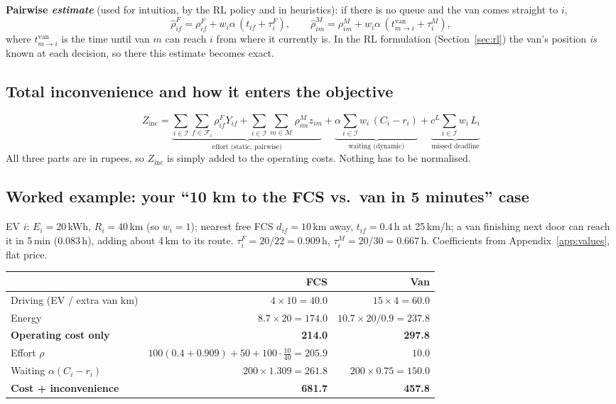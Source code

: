 \documentclass[11pt,a4paper]{article}
\newcommand{\I}{\mathcal{I}}
\newcommand{\F}{\mathcal{F}}
\newcommand{\M}{\mathcal{M}}
\begin{document}
\textbf{Pairwise \emph{estimate}} (used for intuition, by the RL policy and in heuristics): if there is no queue and the van comes straight to $i$,
\[
\hat\rho^{F}_{if}=\rho^F_{if}+w_i\alpha\,(t_{if}+\tau^F_i),\qquad
\hat\rho^{M}_{im}=\rho^M_{im}+w_i\alpha\,(t^{\text{van}}_{m\to i}+\tau^M_i),
\]
where $t^{\text{van}}_{m\to i}$ is the time until van $m$ can reach $i$ from where it currently is. In the RL formulation (Section~\ref{sec:rl}) the van's position \emph{is} known at each decision, so there this estimate becomes exact.

\subsection{Total inconvenience and how it enters the objective}

\begin{equation}
\boxed{\;
Z_{\text{inc}}=\underbrace{\sum_{i\in\I}\sum_{f\in\F_i}\rho^F_{if}Y_{if}+\sum_{i\in\I}\sum_{m\in\M}\rho^M_{im}z_{im}}_{\text{effort (static, pairwise)}}
+\underbrace{\alpha\sum_{i\in\I}w_i\,(C_i-r_i)}_{\text{waiting (dynamic)}}
+\underbrace{c^L\sum_{i\in\I}w_i\,L_i}_{\text{missed deadline}}
\;}\label{eq:inc}
\end{equation}
All three parts are in rupees, so $Z_{\text{inc}}$ is simply added to the operating costs. Nothing has to be normalised.

\subsection{Worked example: your ``10 km to the FCS vs.\ van in 5 minutes'' case}

EV $i$: $E_i=20$\,kWh, $R_i=40$\,km (so $w_i=1$); nearest free FCS $d_{if}=10$\,km away, $t_{if}=0.4$\,h at 25\,km/h; a van finishing next door can reach it in 5\,min ($0.083$\,h), adding about 4\,km to its route. $\tau^F_i=20/22=0.909$\,h, $\tau^M_i=20/30=0.667$\,h. Coefficients from Appendix~\ref{app:values}, flat price.

\begin{center}
\renewcommand{\arraystretch}{1.25}
\begin{tabular}{@{}lrr@{}}
\toprule
 & \textbf{FCS} & \textbf{Van} \\
\midrule
Driving (EV / extra van km) & $4\times10=40.0$ & $15\times4=60.0$ \\
Energy & $8.7\times20=174.0$ & $10.7\times20/0.9=237.8$ \\
\textbf{Operating cost only} & \textbf{214.0} & \textbf{297.8} \\
\midrule
Effort $\rho$ & $100(0.4+0.909)+50+100\cdot\tfrac{10}{40}=205.9$ & $10.0$ \\
Waiting $\alpha(C_i-r_i)$ & $200\times1.309=261.8$ & $200\times0.75=150.0$ \\
\textbf{Cost + inconvenience} & \textbf{681.7} & \textbf{457.8} \\
\bottomrule
\end{tabular}
\end{center}
\end{document}
